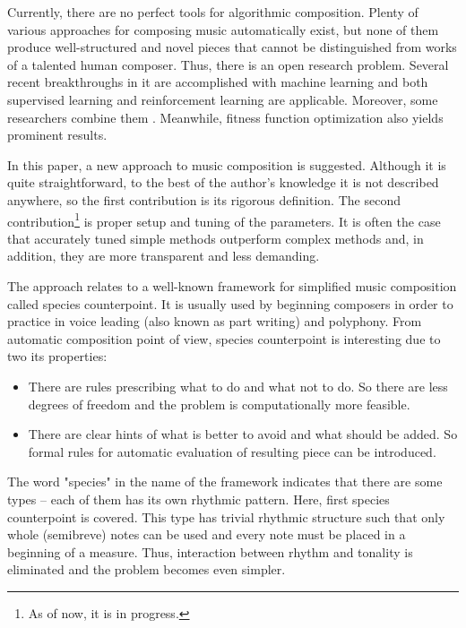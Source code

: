 \documentclass{article}
\begin{document}
Currently, there are no perfect tools for algorithmic composition. Plenty of various approaches for composing music automatically exist, but none of them produce well-structured and novel pieces that cannot be distinguished from works of a talented human composer. Thus, there is an open research problem. Several recent breakthroughs in it are accomplished with machine learning and both supervised learning \cite{johnson2017generating, payne2019musenet} and reinforcement learning \cite{smith2012reinforcement} are applicable. Moreover, some researchers combine them \cite{jaques2016generating, kotecha2018bach, kumar2019polyphonic}. Meanwhile, fitness function optimization also yields prominent results\cite{herremans2012first, herremans2013fifth}.

In this paper, a new approach to music composition is suggested. Although it is quite straightforward, to the best of the author's knowledge it is not described anywhere, so the first contribution is its rigorous definition. The second contribution\footnote{As of now, it is in progress.} is proper setup and tuning of the parameters. It is often the case that accurately tuned simple methods outperform complex methods \cite{dacrema2019are} and, in addition, they are more transparent and less demanding.

The approach relates to a well-known framework for simplified music composition called species counterpoint. It is usually used by beginning composers in order to practice in voice leading (also known as part writing) and polyphony. From automatic composition point of view, species counterpoint is interesting due to two its properties:
\begin{itemize}
	\item There are rules prescribing what to do and what not to do. So there are less degrees of freedom and the problem is computationally more feasible.
	\item There are clear hints of what is better to avoid and what should be added. So formal rules for automatic evaluation of resulting piece can be introduced.
\end{itemize}

The word "species" in the name of the framework indicates that there are some types -- each of them has its own rhythmic pattern. Here, first species counterpoint is covered. This type has trivial rhythmic structure such that only whole (semibreve) notes can be used and every note must be placed in a beginning of a measure. Thus, interaction between rhythm and tonality is eliminated and the problem becomes even simpler. 
\end{document}
